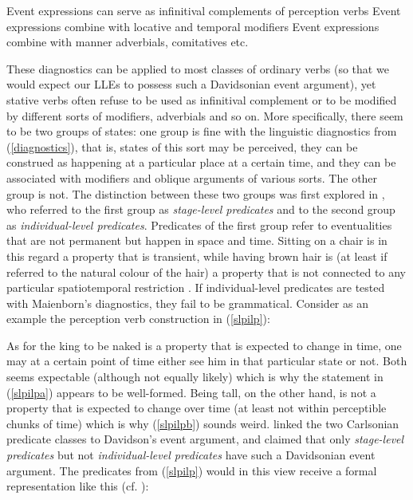 \ea \label{diagnostics}
\ea Event expressions can serve as infinitival complements of perception verbs
\ex Event expressions combine with locative and temporal modifiers
\ex Event expressions combine with manner adverbials, comitatives etc.
\z
\z

These diagnostics can be applied to most classes of ordinary verbs (so that we would expect our LLEs to possess such a Davidsonian event argument), yet stative verbs often refuse to be used as infinitival complement or to be modified by different sorts of modifiers, adverbials and so on. More specifically, there seem to be two groups of states: one group is fine with the linguistic diagnostics from (\ref{diagnostics}), that is, states of this sort may be perceived, they can be construed as happening at a particular place at a certain time, and they can be associated with modifiers and oblique arguments of various sorts. The other group is not. The distinction between these two groups was first explored in \citet{carlson1977reference}, who referred to the first group as \emph{stage-level predicates} and to the second group as \emph{individual-level predicates}. Predicates of the first group refer to eventualities that are not permanent but happen in space and time. Sitting on a chair is in this regard a property that is transient, while having brown hair is (at least if referred to the natural colour of the hair) a property that is not connected to any particular spatiotemporal restriction \citep{kratzer1995individual}. If individual-level predicates are tested with Maienborn's diagnostics, they fail to be grammatical. Consider as an example the perception verb construction in (\ref{slpilp}):

\ea \label{slpilp}
\z
\z

As for the king to be naked is a property that is expected to change in time, one may at a certain point of time either see him in that particular state or not. Both seems expectable (although not equally likely) which is why the statement in (\ref{slpilpa}) appears to be well-formed. Being tall, on the other hand, is not a property that is expected to change over time (at least not within perceptible chunks of time) which is why (\ref{slpilpb}) sounds weird. \citet{kratzer1995individual} linked the two Carlsonian predicate classes to Davidson's event argument, and claimed that only \emph{stage-level predicates} but not \emph{individual-level predicates} have such a Davidsonian event argument. The predicates from (\ref{slpilp}) would in this view receive a formal representation like this (cf. \citealt[814f.]{maienborn2011event}):

